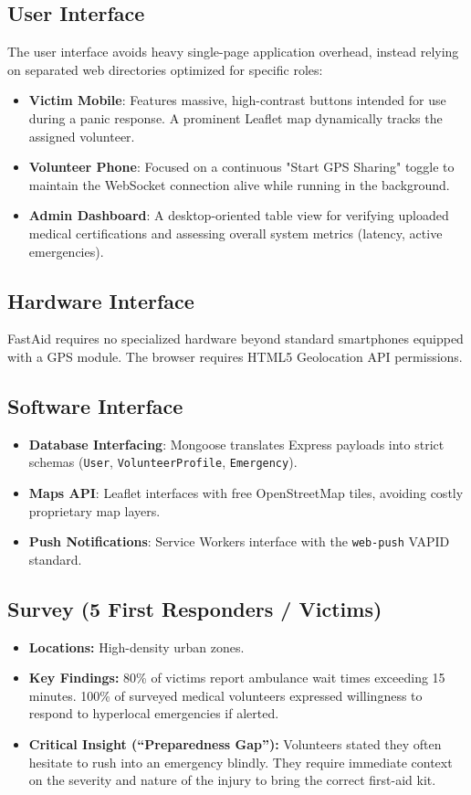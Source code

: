 \documentclass[12pt,a4paper]{article}
\begin{document}
\subsection{User Interface}
The user interface avoids heavy single-page application overhead, instead relying on separated web directories optimized for specific roles:
\begin{itemize}[leftmargin=2em]
  \item \textbf{Victim Mobile}: Features massive, high-contrast buttons intended for use during a panic response. A prominent Leaflet map dynamically tracks the assigned volunteer.
  \item \textbf{Volunteer Phone}: Focused on a continuous "Start GPS Sharing" toggle to maintain the WebSocket connection alive while running in the background.
  \item \textbf{Admin Dashboard}: A desktop-oriented table view for verifying uploaded medical certifications and assessing overall system metrics (latency, active emergencies).
\end{itemize}

\subsection{Hardware Interface}
FastAid requires no specialized hardware beyond standard smartphones equipped with a GPS module. The browser requires HTML5 Geolocation API permissions.

\subsection{Software Interface}
\begin{itemize}[leftmargin=2em]
  \item \textbf{Database Interfacing}: Mongoose translates Express payloads into strict schemas (\texttt{User}, \texttt{VolunteerProfile}, \texttt{Emergency}).
  \item \textbf{Maps API}: Leaflet interfaces with free OpenStreetMap tiles, avoiding costly proprietary map layers.
  \item \textbf{Push Notifications}: Service Workers interface with the \texttt{web-push} VAPID standard.
\end{itemize}

\subsection{Survey (5 First Responders / Victims)}
\begin{itemize}[nosep]
    \item \textbf{Locations:} High-density urban zones.
    \item \textbf{Key Findings:} 80\% of victims report ambulance wait times exceeding 15 minutes. 100\% of surveyed medical volunteers expressed willingness to respond to hyperlocal emergencies if alerted.
    \item \textbf{Critical Insight (``Preparedness Gap''):} Volunteers stated they often hesitate to rush into an emergency blindly. They require immediate context on the severity and nature of the injury to bring the correct first-aid kit.
\end{itemize}
\end{document}
